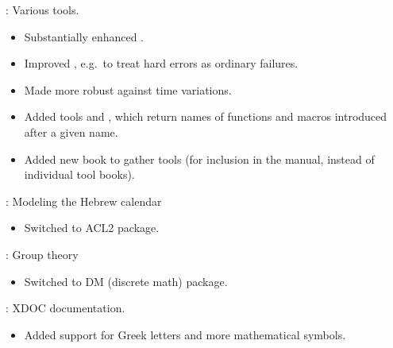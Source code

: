 \begin{frame}

\implibtitle

:
Various tools.
\begin{itemize}
\item Substantially enhanced .
\item Improved , e.g.\ to treat hard errors as ordinary failures.
\item Made  more robust against time variations.
\item Added tools  and ,
  which return names of functions and macros introduced after a given name.
\item Added new  book to gather tools (for inclusion in the
  manual, instead of individual tool books).
\end{itemize}

\end{frame}


\begin{frame}

\implibtitle

:
Modeling the Hebrew calendar
\begin{itemize}
\item Switched to ACL2 package.
\end{itemize}

:
Group theory
\begin{itemize}
\item Switched to DM (discrete math) package.
\end{itemize}

\end{frame}


\begin{frame}

\implibtitle

:
XDOC documentation.
\begin{itemize}
\item Added support for Greek letters and more mathematical symbols.
\end{itemize}

\end{frame}



